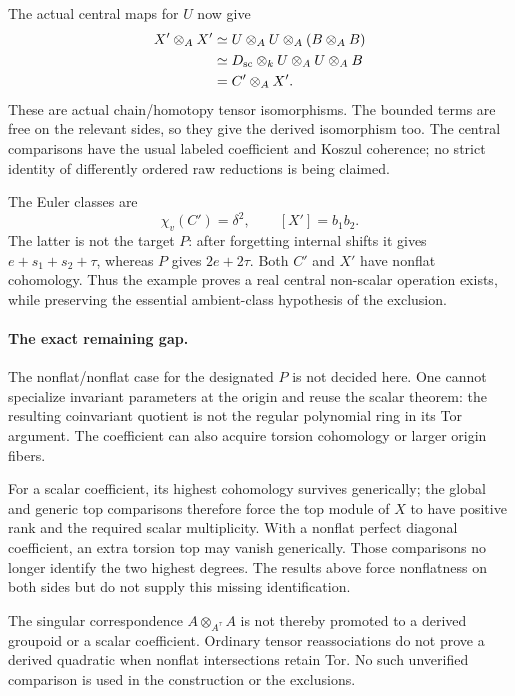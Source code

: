 \documentclass[11pt,a4paper]{article}
\theoremstyle{named}\newtheorem{finding}{Finding}[section]
\theoremstyle{definition}\newtheorem{definition}[finding]{Definition}
\theoremstyle{remark}\newtheorem{remark}[finding]{Remark}
\begin{document}
The actual central maps for \(U\) now give
\begin{align}\label{eq:centralCoefficientActualExample}
 X'\otimes_A X'
 &\simeq U\otimes_A U\otimes_A(B\otimes_A B)\notag\\
 &\simeq D_{\mathrm{sc}}\otimes_k U\otimes_A U\otimes_A B\notag\\
 &=C'\otimes_A X'.
\end{align}
These are actual chain/homotopy tensor isomorphisms.
The bounded terms are free on the relevant sides,
so they give the derived isomorphism too.
The central comparisons have the usual labeled
coefficient and Koszul coherence; no strict
identity of differently ordered raw reductions
is being claimed.

The Euler classes are
\[
                     \chi_v(C')=\delta^2,
                     \qquad [X']=b_1b_2.
\]
The latter is not the target \(P\): after forgetting
internal shifts it gives \(e+s_1+s_2+\tau\), whereas
\(P\) gives \(2e+2\tau\).
Both \(C'\) and \(X'\) have nonflat cohomology.
Thus the example proves a real central non-scalar
operation exists, while preserving the essential
ambient-class hypothesis of the exclusion.

\paragraph{The exact remaining gap.}
The nonflat/nonflat case for the designated \(P\)
is not decided here. One cannot specialize invariant
parameters at the origin and reuse the scalar theorem:
the resulting coinvariant quotient is not the
regular polynomial ring in its Tor argument.
The coefficient can also acquire torsion cohomology
or larger origin fibers.

For a scalar coefficient, its highest cohomology
survives generically; the global and generic top
comparisons therefore force the top module of \(X\)
to have positive rank and the required scalar
multiplicity. With a nonflat perfect diagonal
coefficient, an extra torsion top may vanish
generically. Those comparisons no longer identify
the two highest degrees. The results above force
nonflatness on both sides but do not supply this
missing identification.

The singular correspondence
\(A\otimes_{A^\tau}A\) is not thereby promoted to
a derived groupoid or a scalar coefficient.
Ordinary tensor reassociations do not prove a
derived quadratic when nonflat intersections
retain Tor. No such unverified comparison is
used in the construction or the exclusions.
\end{document}
